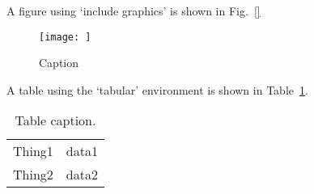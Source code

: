 \label{chap:anotherChapter}

A figure using `include graphics' is shown in Fig.~\ref{}

\begin{figure}
    \centering
    \texttt{[image: ]}
    \caption{Caption}
    \label{fig:my_label}
\end{figure}

A table using the `tabular' environment is shown in Table~\ref{tab:tabular}.

\begin{table}
    \centering
    \caption[Table caption.]{Table caption.}
    \label{tab:tabular}
    \begin{tabular}{cc}
      \hline
      Thing1    &  data1  \\
      Thing2    &  data2  \\
      \hline
    \end{tabular}
\end{table}